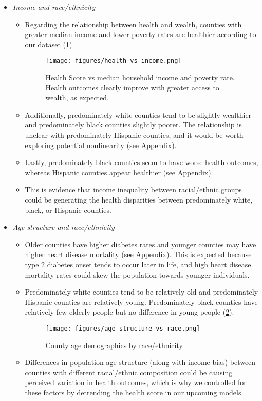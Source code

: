 \documentclass{article}
\begin{document}
\begin{itemize}[leftmargin=0pt]
\begin{itemize}
\item[] \textit{Income and race/ethnicity}
\begin{itemize}
    \item[] Regarding the relationship between health and wealth, counties with greater median income and lower poverty rates are healthier according to our dataset (\ref{fig:health_wealth}). 
        \begin{figure}[h!]
            \centering
            \texttt{[image: figures/health vs income.png]}
            \caption{Health Score vs median household income and poverty rate. Health outcomes clearly improve with greater access to wealth, as expected.}
            \label{fig:health_wealth}
        \end{figure}
    \item[] Additionally, predominately white counties tend to be slightly wealthier and predominately black counties slightly poorer. The relationship is unclear with predominately Hispanic counties, and it would be worth exploring potential nonlinearity (\hyperref[fig:income_race]{see Appendix}). 
    \item[] Lastly, predominately black counties seem to have worse health outcomes, whereas Hispanic counties appear healthier (\hyperref[fig:health_race]{see Appendix}). 
    \item[] This is evidence that income inequality between racial/ethnic groups could be generating the health disparities between predominately white, black, or Hispanic counties.
\end{itemize}


\item[] \textit{Age structure and race/ethnicity}
\begin{itemize}
    \item[] Older counties have higher diabetes rates and younger counties may have higher heart disease mortality (\hyperref[fig:age_chronic]{see Appendix}). This is expected because type 2 diabetes onset tends to occur later in life, and high heart disease mortality rates could skew the population towards younger individuals. 
    \item[] Predominately white counties tend to be relatively old and predominately Hispanic counties are relatively young. Predominately black counties have relatively few elderly people but no difference in young people (\ref{fig:age_race}).
        \begin{figure}[h!]
            \centering
            \texttt{[image: figures/age structure vs race.png]}
            \caption{County age demographics by race/ethnicity}
            \label{fig:age_race}
        \end{figure}
    \item[] Differences in population age structure (along with income bias) between counties with different racial/ethnic composition could be causing perceived variation in health outcomes, which is why we controlled for these factors by detrending the health score in our upcoming models.
\end{itemize}


\end{itemize}
\end{itemize}
\end{document}
